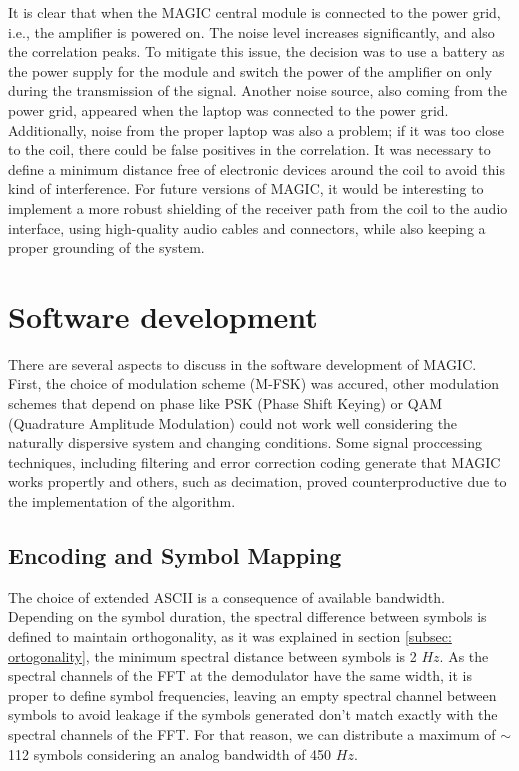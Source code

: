 It is clear that when the MAGIC central module is connected to the power grid, i.e., the amplifier is powered on. The noise level increases significantly, and also the correlation peaks.
\newp
To mitigate this issue, the decision was to use a battery as the power supply for the module and switch the power of the amplifier on only during the transmission of the signal.
\newp
Another noise source, also coming from the power grid, appeared when the laptop was connected to the power grid. Additionally, noise from the proper laptop was also a problem; if it was too close to the coil, there could be false positives in the correlation. It was necessary to define a minimum distance free of electronic devices around the coil to avoid this kind of interference. For future versions of MAGIC, it would be interesting to implement a more robust shielding of the receiver path from the coil to the audio interface, using high-quality audio cables and connectors, while also keeping a proper grounding of the system.


\section{Software development}

There are several aspects to discuss in the software development of MAGIC. First, the choice of modulation scheme (M-FSK) was accured, other modulation schemes that depend on phase like PSK (Phase Shift Keying) or QAM (Quadrature Amplitude Modulation) could not work well considering the naturally dispersive system and changing conditions. Some signal proccessing techniques, including filtering and error correction coding generate that MAGIC works propertly and others, such as decimation, proved counterproductive due to the implementation of the algorithm.

\subsection{Encoding and Symbol Mapping}\label{subsec: Analysis-codification}

The choice of extended ASCII is a consequence of available bandwidth. Depending on the symbol duration, the spectral difference between symbols is defined to maintain orthogonality, as it was explained in section \ref{subsec: ortogonality}, the minimum spectral distance between symbols is 2 $Hz$. As the spectral channels of the FFT at the demodulator have the same width, it is proper to define symbol frequencies, leaving an empty spectral channel between symbols to avoid leakage if the symbols generated don't match exactly with the spectral channels of the FFT. For that reason, we can distribute a maximum of $\sim$112 symbols considering an analog bandwidth of 450 $Hz$.
\newp

